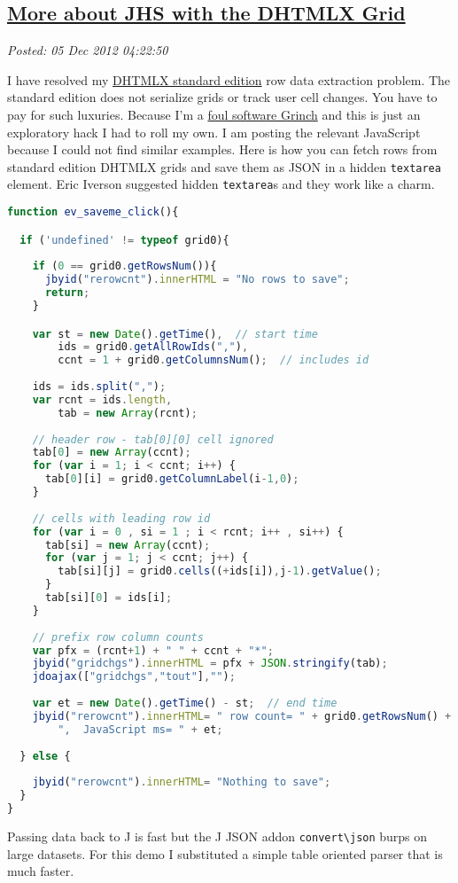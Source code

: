 %

\subsection*{\href{http://bakerjd99.wordpress.com/2012/12/04/more-about-jhs-with-dhtmlx-the-grid/}{More about JHS with the DHTMLX Grid}}


\noindent\emph{Posted: 05 Dec 2012 04:22:50}
\vspace{6pt}

I have resolved my \href{http://dhtmlx.com/docs/download.shtml}{DHTMLX
standard edition} row data extraction problem. The standard edition does
not serialize grids or track user cell changes. You have to pay for such
luxuries. Because I'm a
\href{http://www.youtube.com/watch?v=ZgP0aUKlmNw}{foul software Grinch}
and this is just an exploratory hack I had to roll my own. I am posting
the relevant JavaScript because I could not find similar examples. Here
is how you can fetch rows from standard edition DHTMLX grids and save
them as JSON in a hidden \texttt{textarea} element. Eric Iverson
suggested hidden \texttt{textarea}s and they work like a charm.


\begin{lstlisting}[language=JavaScript,frame=single,framerule=0pt,label=lst:scr3516X0]
function ev_saveme_click(){

  if ('undefined' != typeof grid0){
  
    if (0 == grid0.getRowsNum()){
      jbyid("rerowcnt").innerHTML = "No rows to save"; 
      return;
    }

    var st = new Date().getTime(),  // start time  
        ids = grid0.getAllRowIds(","),
        ccnt = 1 + grid0.getColumnsNum();  // includes id
      
    ids = ids.split(",");  
    var rcnt = ids.length,
        tab = new Array(rcnt);
    
    // header row - tab[0][0] cell ignored
    tab[0] = new Array(ccnt);  
    for (var i = 1; i < ccnt; i++) {
      tab[0][i] = grid0.getColumnLabel(i-1,0); 
    }
     
    // cells with leading row id
    for (var i = 0 , si = 1 ; i < rcnt; i++ , si++) {
      tab[si] = new Array(ccnt);
      for (var j = 1; j < ccnt; j++) {
        tab[si][j] = grid0.cells((+ids[i]),j-1).getValue();
      }
      tab[si][0] = ids[i];
    }
  
    // prefix row column counts 
    var pfx = (rcnt+1) + " " + ccnt + "*";
    jbyid("gridchgs").innerHTML = pfx + JSON.stringify(tab);
    jdoajax(["gridchgs","tout"],"");
  
    var et = new Date().getTime() - st;  // end time    
    jbyid("rerowcnt").innerHTML= " row count= " + grid0.getRowsNum() +  
        ",  JavaScript ms= " + et; 
        
  } else {
  
    jbyid("rerowcnt").innerHTML= "Nothing to save";     
  }
}
\end{lstlisting}

Passing data back to J is fast but the J JSON addon
\texttt{convert\textbackslash{}json} burps on large datasets. For this
demo I substituted a simple table oriented parser that is much faster.



%